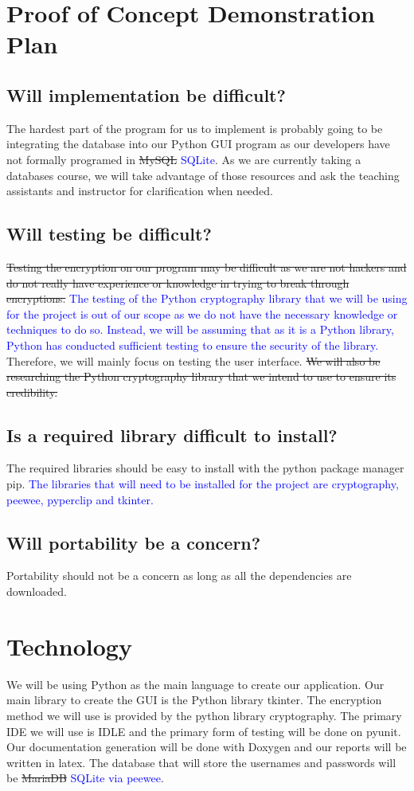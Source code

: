 \documentclass{article}
\begin{document}
\section{Proof of Concept Demonstration Plan}
\subsection{Will implementation be difficult?}
The hardest part of the program for us to implement is probably going to be integrating the database into our Python GUI program as our developers have not formally programed in \sout{MySQL} \textcolor{blue}{SQLite}. As we are currently taking a databases course, we will take advantage of those resources and ask the teaching assistants and instructor for clarification when needed.
\subsection{Will testing be difficult?}
\sout{Testing the encryption on our program may be difficult as we are not hackers and do not really have experience or knowledge in trying to break through encryptions.} \textcolor{blue}{The testing of the Python cryptography library that we will be using for the project is out of our scope as we do not have the necessary knowledge or techniques to do so. Instead, we will be assuming that as it is a Python library, Python has conducted sufficient testing to ensure the security of the library.} Therefore, we will mainly focus on testing the user interface. \sout{We will also be researching the Python cryptography library that we intend to use to ensure its credibility.}
\subsection{Is a required library difficult to install?}
The required libraries should be easy to install with the python package manager pip. \textcolor{blue}{The libraries that will need to be installed for the project are cryptography, peewee, pyperclip and tkinter.}
\subsection{Will portability be a concern?}
Portability should not be a concern as long as all the dependencies are downloaded.

\section{Technology}
We will be using Python as the main language to create our application. Our main library to create the GUI is the Python library tkinter. The encryption method we will use is provided by the python library cryptography. The primary IDE we will use is IDLE and the primary form of testing will be done on pyunit. Our documentation generation will be done with Doxygen and our reports will be written in latex. The database that will store the usernames and passwords will be \sout{MariaDB} \textcolor{blue}{SQLite via peewee}.
\end{document}
